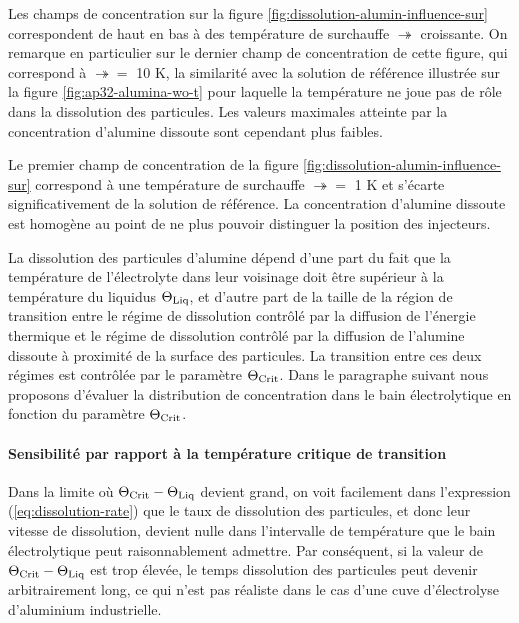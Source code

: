 Les champs de concentration sur la figure
\ref{fig:dissolution-alumin-influence-sur} correspondent de haut en
bas à des température de surchauffe $\tsur$ croissante. On remarque
en particulier sur le dernier champ de concentration de cette figure,
qui correspond à $\tsur = $ \num{10} \si{\kelvin}, la similarité avec la
solution de référence illustrée sur la figure
\ref{fig:ap32-alumina-wo-t} pour laquelle la température ne joue pas
de rôle dans la dissolution des particules. Les valeurs maximales
atteinte par la concentration d'alumine dissoute sont cependant plus faibles.

Le premier champ de concentration de la figure
\ref{fig:dissolution-alumin-influence-sur} correspond à une
température de surchauffe $\tsur =$ \num{1} \si{\kelvin} et s'écarte
significativement de la solution de référence. La concentration
d'alumine dissoute est homogène au point de ne plus pouvoir
distinguer la position des injecteurs.

La dissolution des particules d'alumine dépend d'une part du fait que
la température de l'électrolyte dans leur voisinage doit être
supérieur à la température du liquidus $\Theta_\text{Liq}$, et d'autre part de la
taille de la région de transition entre le régime de dissolution
contrôlé par la diffusion de l'énergie thermique et le régime de
dissolution contrôlé par la diffusion de l'alumine dissoute à
proximité de la surface des particules. La transition entre ces deux
régimes est contrôlée par le paramètre $\Theta_\text{Crit}$. Dans le paragraphe
suivant nous proposons d'évaluer la distribution de concentration dans
le bain électrolytique en fonction du paramètre $\Theta_\text{Crit}$.


\clearpage
\paragraph{Sensibilité par rapport à la température critique de transition}


Dans la limite où $\Theta_\text{Crit} - \Theta_\text{Liq}$ devient grand, on voit facilement
dans l'expression (\ref{eq:dissolution-rate}) que le taux de
dissolution des particules, et donc leur vitesse de dissolution,
devient nulle dans l'intervalle de température que le bain
électrolytique peut raisonnablement admettre. Par conséquent, si la
valeur de $\Theta_\text{Crit} - \Theta_\text{Liq}$ est trop élevée, le temps dissolution des
particules peut devenir arbitrairement long, ce qui n'est pas réaliste
dans le cas d'une cuve d'électrolyse d'aluminium industrielle.

